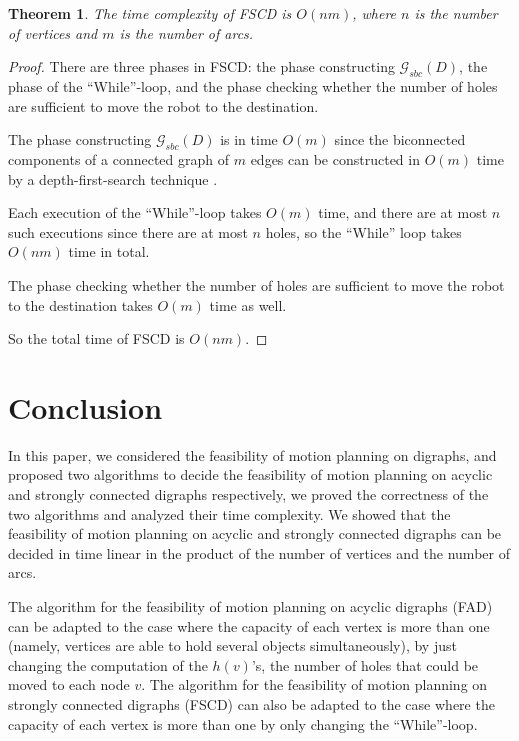 \documentclass{article}
\newtheorem{thm}{Theorem}
\begin{document}
\begin{thm}\label{thm:strong-complexity}
The time complexity of FSCD is $O(nm)$, where $n$ is the number of
vertices and $m$ is the number of arcs.
\end{thm}
\begin{proof}

There are three phases in FSCD: the phase constructing
$\mathcal{G}_{sbc}(D)$, the phase of the ``While''-loop, and the
phase checking whether the number of holes are sufficient to move
the robot to the destination.

The phase constructing $\mathcal{G}_{sbc}(D)$ is in time $O(m)$
since the biconnected components of a connected graph of $m$ edges
can be constructed in $O(m)$ time by a depth-first-search technique
\cite{CLRS01}.

Each execution of the ``While''-loop takes $O(m)$ time, and there
are at most $n$ such executions since there are at most $n$ holes,
so the ``While'' loop takes $O(nm)$ time in total.

The phase checking whether the number of holes are sufficient to
move the robot to the destination takes $O(m)$ time as well.

So the total time of FSCD is $O(nm)$.
\end{proof}


\section{Conclusion}

In this paper, we considered the feasibility of motion planning on
digraphs, and proposed two algorithms to decide the feasibility of
motion planning on acyclic and strongly connected digraphs
respectively, we proved the correctness of the two algorithms and
analyzed their time complexity. We showed that the feasibility of
motion planning on acyclic and strongly connected digraphs can be
decided in time linear in the product of the number of vertices and
the number of arcs.

The algorithm for the feasibility of motion planning on acyclic
digraphs (FAD) can be adapted to the case where the capacity of each
vertex is more than one (namely, vertices are able to hold several
objects simultaneously), by just changing the computation of the
$h(v)$'s, the number of holes that could be moved to each node $v$.
The algorithm for the feasibility of motion planning on strongly
connected digraphs (FSCD) can also be adapted to the case where the
capacity of each vertex is more than one by only changing the
``While''-loop.
\end{document}
